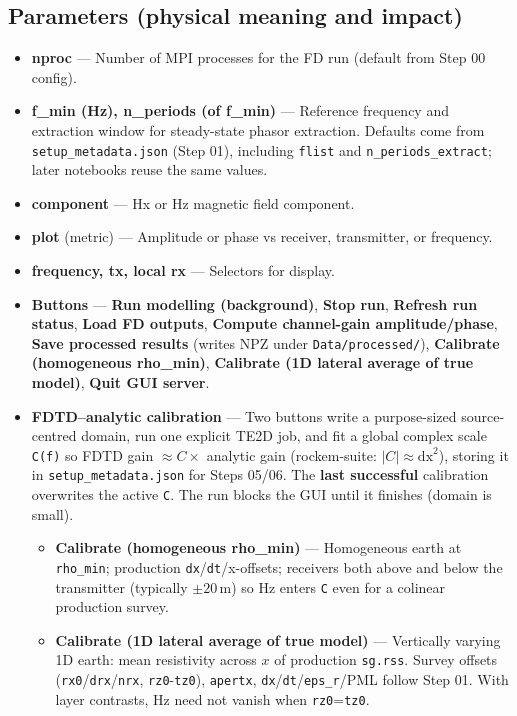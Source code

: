 \documentclass[11pt,a4paper]{article}
\begin{document}
\subsection{Parameters (physical meaning and impact)}

\begin{itemize}

  \item \textbf{nproc} — Number of MPI processes for the FD run (default from Step 00 config).

  \item \textbf{f\_min (Hz), n\_periods (of f\_min)} — Reference frequency and extraction window for steady-state phasor extraction. Defaults come from \texttt{setup\_metadata.json} (Step 01), including \texttt{flist} and \texttt{n\_periods\_extract}; later notebooks reuse the same values.

  \item \textbf{component} — Hx or Hz magnetic field component.

  \item \textbf{plot} (metric) — Amplitude or phase vs receiver, transmitter, or frequency.

  \item \textbf{frequency, tx, local rx} — Selectors for display.

  \item \textbf{Buttons} — \textbf{Run modelling (background)}, \textbf{Stop run}, \textbf{Refresh run status}, \textbf{Load FD outputs}, \textbf{Compute channel-gain amplitude/phase}, \textbf{Save processed results} (writes NPZ under \texttt{Data/processed/}), \textbf{Calibrate (homogeneous rho\_min)}, \textbf{Calibrate (1D lateral average of true model)}, \textbf{Quit GUI server}.

  \item \textbf{FDTD--analytic calibration} — Two buttons write a purpose-sized source-centred domain, run one explicit TE2D job, and fit a global complex scale \texttt{C(f)} so FDTD gain $\approx C \times$ analytic gain (rockem-suite: $|C| \approx \mathrm{dx}^2$), storing it in \texttt{setup\_metadata.json} for Steps 05/06. The \textbf{last successful} calibration overwrites the active \texttt{C}. The run blocks the GUI until it finishes (domain is small).

  \begin{itemize}
    \item \textbf{Calibrate (homogeneous rho\_min)} — Homogeneous earth at \texttt{rho\_min}; production \texttt{dx}/\texttt{dt}/x-offsets; receivers both above and below the transmitter (typically $\pm 20\,\mathrm{m}$) so Hz enters \texttt{C} even for a colinear production survey.
    \item \textbf{Calibrate (1D lateral average of true model)} — Vertically varying 1D earth: mean resistivity across $x$ of production \texttt{sg.rss}. Survey offsets (\texttt{rx0}/\texttt{drx}/\texttt{nrx}, \texttt{rz0}-\texttt{tz0}), \texttt{apertx}, \texttt{dx}/\texttt{dt}/\texttt{eps\_r}/PML follow Step 01. With layer contrasts, Hz need not vanish when \texttt{rz0}=\texttt{tz0}.
  \end{itemize}


\end{itemize}
\end{document}

